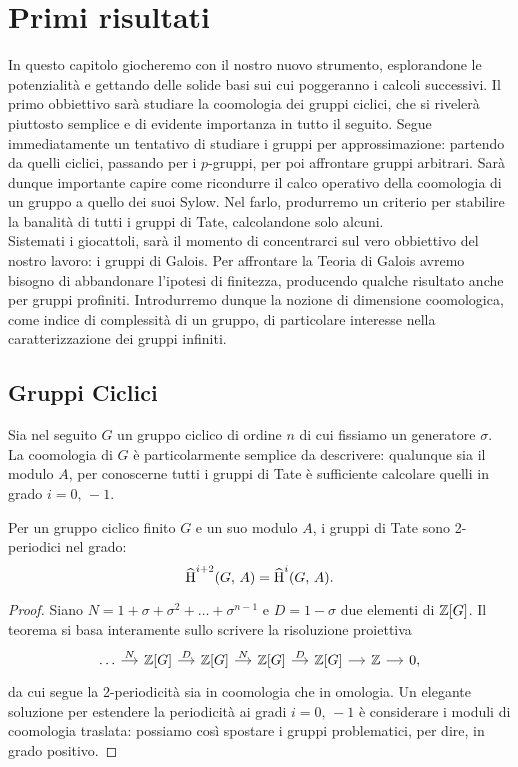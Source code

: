 \chapter{Primi risultati}
In questo capitolo giocheremo con il nostro nuovo strumento, esplorandone le potenzialità e gettando delle solide basi sui cui poggeranno i calcoli successivi. Il primo obbiettivo sarà studiare la coomologia dei gruppi ciclici, che si rivelerà piuttosto semplice e di evidente importanza in tutto il seguito. Segue immediatamente un tentativo di studiare i gruppi per approssimazione: partendo da quelli ciclici, passando per i $ p $-gruppi, per poi affrontare gruppi arbitrari. Sarà dunque importante capire come ricondurre il calco operativo della coomologia di un gruppo a quello dei suoi Sylow. Nel farlo, produrremo un criterio per stabilire la banalità di tutti i gruppi di Tate, calcolandone solo alcuni. \\

Sistemati i giocattoli, sarà il momento di concentrarci sul vero obbiettivo del nostro lavoro: i gruppi di Galois. Per affrontare la Teoria di Galois avremo bisogno di abbandonare l'ipotesi di finitezza, producendo qualche risultato anche per gruppi profiniti. Introdurremo dunque la nozione di dimensione coomologica, come indice di complessità di un gruppo, di particolare interesse nella caratterizzazione dei gruppi infiniti.

\section{Gruppi Ciclici}
Sia nel seguito $ G $ un gruppo ciclico di ordine $ n $ di cui fissiamo un generatore $ \sigma $. La coomologia di $ G $ è particolarmente semplice da descrivere: qualunque sia il modulo $ A $, per conoscerne tutti i gruppi di Tate è sufficiente calcolare quelli in grado $ i = 0, \, -1 $.

\begin{theorem}\label{ciclici}
	Per un gruppo ciclico finito $ G $ e un suo modulo $ A $, i gruppi di Tate sono 2-periodici nel grado:
	\[ \operatorname{\widehat{H}}^{i+2}(G, \, A) = \operatorname{\widehat{H}}^{i}(G, \, A). \]
\end{theorem}

\begin{proof}
	Siano $ N = 1 + \sigma + \sigma^2 + \dots + \sigma^{n-1} $ e $ D = 1 - \sigma $ due elementi di $ \mathbb{Z}[G] $. Il teorema si basa interamente sullo scrivere la risoluzione proiettiva
	\[ \begin{tikzcd}[column sep = small]
	\dots \rar["N"]
	& \Z[G] \rar["D"]
	& \Z[G] \rar["N"]
	& \Z[G] \rar["D"]
	& \Z[G] \rar
	& \Z \rar & 0,
	\end{tikzcd} \]
	da cui segue la 2-periodicità sia in coomologia che in omologia. Un elegante soluzione per estendere la periodicità ai gradi $ i = 0, \, -1 $ è considerare i moduli di coomologia traslata: possiamo così spostare i gruppi problematici, per dire, in grado positivo. 
\end{proof}

